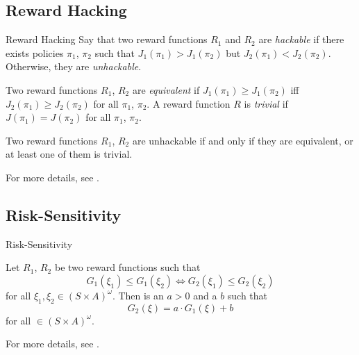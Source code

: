 \documentclass{beamer}
\begin{document}
\subsection{Reward Hacking}
\begin{frame}{Reward Hacking}
    \small
    Say that two reward functions $R_1$ and $R_2$ are \emph{hackable} if there exists policies $\pi_1$, $\pi_2$ such that $J_1(\pi_1) > J_1(\pi_2)$ but $J_2(\pi_1) < J_2(\pi_2)$. Otherwise, they are \emph{unhackable}.

    \vspace{0.5cm}
    Two reward functions $R_1$, $R_2$ are \emph{equivalent} if $J_1(\pi_1) \geq J_1(\pi_2)$ iff $J_2(\pi_1) \geq J_2(\pi_2)$ for all $\pi_1$, $\pi_2$. A reward function $R$ is \emph{trivial} if $J(\pi_1) = J(\pi_2)$ for all $\pi_1$, $\pi_2$.
    
    \vspace{0.5cm}
    \begin{theorem}\label{thm:reward_hacking}
    Two reward functions $R_1$, $R_2$ are unhackable if and only if they are equivalent, or at least one of them is trivial.
    \end{theorem}

    \vspace{0.5cm}
    For more details, see \citet{rewardhacking}.
\end{frame}

\subsection{Risk-Sensitivity}
\begin{frame}{Risk-Sensitivity}
    \small
    \begin{theorem}\label{thm:monotonic_implies_affine}
    Let $R_1$, $R_2$ be two reward functions such that 
    $$
    G_1(\xi_1) \leq G_1(\xi_2) \iff G_2(\xi_1) \leq G_2(\xi_2)
    $$
    for all $\xi_1, \xi_2 \in (S\times A)^\omega$. Then is an $a > 0$ and a $b$ such that
    $$
    G_2(\xi) = a \cdot G_1(\xi) + b
    $$
    for all $\in (S\times A)^\omega$.
    \end{theorem}

    \vspace{0.5cm}
    For more details, see \citet{pmlr-v216-skalse23a}.
\end{frame}
\end{document}
